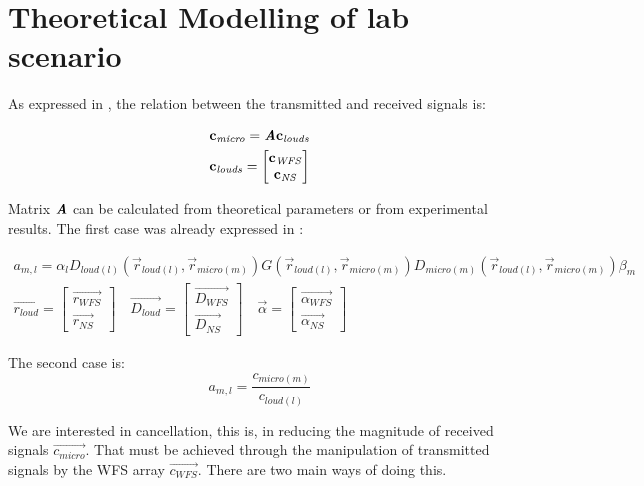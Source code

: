 \section{Theoretical Modelling of lab scenario}
As expressed in , the relation between the transmitted and received signals is:

\begin{gather}
\mathbf{c_\mathit{micro}} = \bm{\mathit{A}} \mathbf{c_\mathit{louds}} \\
\mathbf{c_\mathit{louds}} = 
\begin{bmatrix}
	\mathbf{c_\mathit{WFS}} \\
	\mathbf{c_\mathit{NS}}
\end{bmatrix}
\label{transEqMatrixRep1}
\end{gather}

Matrix $\bm{\mathit{A}}$ can be calculated from theoretical parameters or from experimental results. The first case was already expressed in :

\begin{gather}
a_{m,l} = \alpha_l D_{loud (l)}(\vec{r}_{loud (l)}, \vec{r}_{micro (m)}) G(\vec{r}_{loud (l)}, \vec{r}_{micro (m)}) D_{micro (m)}(\vec{r}_{loud (l)}, \vec{r}_{micro (m)}) \beta_m 
\label{acPathTheoricRep1} \\
\vec{r_\mathit{loud}} =
\begin{bmatrix}
	\vec{r_\mathit{WFS}} \\
	\vec{r_\mathit{NS}}
\end{bmatrix}
\quad
\vec{D_\mathit{loud}} =
\begin{bmatrix}
	\vec{D_\mathit{WFS}} \\
	\vec{D_\mathit{NS}}
\end{bmatrix} 
\quad
\vec{\alpha} =
\begin{bmatrix}
	\vec{\alpha_\mathit{WFS}} \\
	\vec{\alpha_\mathit{NS}}
\end{bmatrix}
\label{WFSandNSconcatenation}
\end{gather}

The second case is:
\begin{equation}
a_{m, l} = \frac{c_{\mathit{micro} (m)}}{c_{\mathit{loud} (l)}}
\end{equation}

We are interested in cancellation, this is, in reducing the magnitude of received signals $\vec{c_\mathit{micro}}$. That must be achieved through the manipulation of transmitted signals by the WFS array $\vec{c_\mathit{WFS}}$. There are two main ways of doing this.

